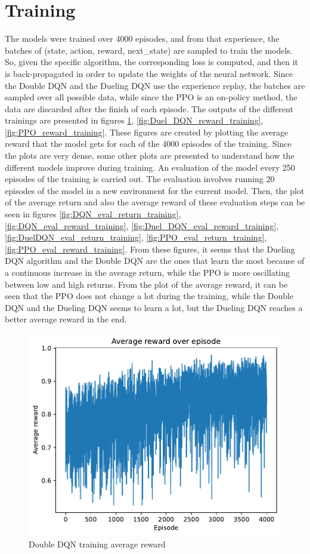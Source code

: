 \documentclass{article}
\begin{document}
\section{Training}\label{section:Training}
The models were trained over 4000 episodes, and from that experience, the batches of (state, action, reward, next\_state) are sampled to train the models. So, given the specific algorithm, the corresponding loss is computed, and then it is back-propagated in order to update the weights of the neural network.
Since the Double DQN and the Dueling DQN use the experience replay, the batches are sampled over all possible data, while since the PPO is an on-policy method, the data are discarded after the finish of each episode.
The outputs of the different trainings are presented in figures \ref{fig:DQN_reward_training}, \ref{fig:Duel_DQN_reward_training}, \ref{fig:PPO_reward_training}. These figures are created by plotting the average reward that the model gets for each of the 4000 episodes of the training.
Since the plots are very dense, some other plots are presented to understand how the different models improve during training. An evaluation of the model every 250 episodes of the training is carried out. The evaluation involves running 20 episodes of the model in a new environment for the current model. Then, the plot of the average return and also the average reward of these evaluation steps can be seen in figures \ref{fig:DQN_eval_return_training}, \ref{fig:DQN_eval_reward_training}, \ref{fig:Duel_DQN_eval_reward_training}, \ref{fig:DuelDQN_eval_return_training}, \ref{fig:PPO_eval_return_training}, \ref{fig:PPO_eval_reward_training}.
From these figures, it seems that the Dueling DQN algorithm and the Double DQN are the ones that learn the most because of a continuous increase in the average return, while the PPO is more oscillating between low and high returns. From the plot of the average reward, it can be seen that the PPO does not change a lot during the training, while the Double DQN and the Dueling DQN seems to learn a lot, but the Dueling DQN reaches a better average reward in the end.

\begin{figure}
    \centering
    \includegraphics[width=0.7\linewidth]{img/DQN_training.pdf}
    \caption{Double DQN training average reward}
    \label{fig:DQN_reward_training}
\end{figure}
\end{document}
